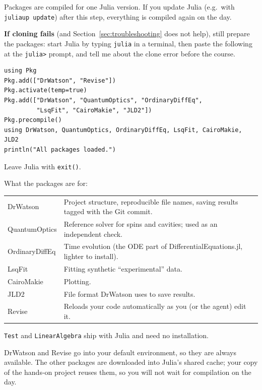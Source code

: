 \documentclass[11pt,a4paper]{article}
\newcommand{\cmd}[1]{\texttt{#1}}
\begin{document}
\begin{warn}
Packages are compiled for one Julia version. If you update Julia (e.g.\ with
\cmd{juliaup update}) after this step, everything is compiled again on the day.
\end{warn}

\textbf{If cloning fails} (and Section~\ref{sec:troubleshooting} does not help), still
prepare the packages: start Julia by typing \cmd{julia} in a terminal, then paste the
following at the \cmd{julia>} prompt, and tell me about the clone error before the course.
\begin{lstlisting}[language={}]
using Pkg
Pkg.add(["DrWatson", "Revise"])
Pkg.activate(temp=true)
Pkg.add(["DrWatson", "QuantumOptics", "OrdinaryDiffEq",
         "LsqFit", "CairoMakie", "JLD2"])
Pkg.precompile()
using DrWatson, QuantumOptics, OrdinaryDiffEq, LsqFit, CairoMakie, JLD2
println("All packages loaded.")
\end{lstlisting}
Leave Julia with \cmd{exit()}.

What the packages are for:
\begin{center}
\renewcommand{\arraystretch}{1.15}
\begin{tabularx}{\textwidth}{@{}l X@{}}
\toprule
DrWatson        & Project structure, reproducible file names, saving results tagged with the Git commit. \\
QuantumOptics   & Reference solver for spins and cavities; used as an independent check. \\
OrdinaryDiffEq  & Time evolution (the ODE part of DifferentialEquations.jl, lighter to install). \\
LsqFit          & Fitting synthetic ``experimental'' data. \\
CairoMakie      & Plotting. \\
JLD2            & File format DrWatson uses to save results. \\
Revise          & Reloads your code automatically as you (or the agent) edit it. \\
\bottomrule
\end{tabularx}
\end{center}
\cmd{Test} and \cmd{LinearAlgebra} ship with Julia and need no installation.

DrWatson and Revise go into your default environment, so they are always available.
The other packages are downloaded into Julia's shared cache; your copy of the hands-on
project reuses them, so you will not wait for compilation on the day.
\end{document}
